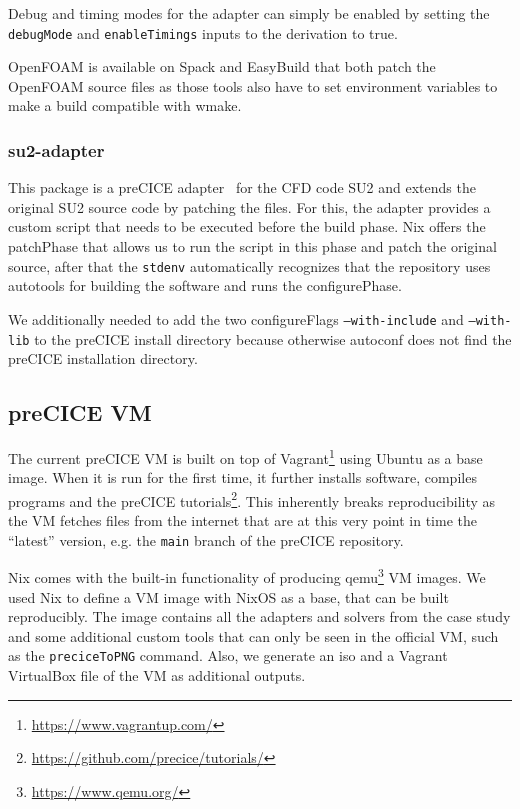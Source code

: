 \documentclass{eceasst}
\begin{document}
Debug and timing modes for the adapter can simply be enabled by setting the \texttt{debugMode} and \texttt{enableTimings} inputs to the derivation to true.

OpenFOAM is available on Spack and EasyBuild that both patch the OpenFOAM source files as those tools also have to set environment variables to make a build compatible with wmake.\\

\subsubsection{su2-adapter}

This package is a preCICE adapter~\cite{Uekermann2017_Adapters} for the CFD code SU2 and extends the original SU2 source code by patching the files.
For this, the adapter provides a custom script that needs to be executed before the build phase.
Nix offers the patchPhase that allows us to run the script in this phase and patch the original source, after that the \texttt{stdenv} automatically recognizes that the repository uses autotools for building the software and runs the configurePhase.

We additionally needed to add the two configureFlags \texttt{--with-include} and \texttt{--with-lib} to the preCICE install directory because otherwise autoconf does not find the preCICE installation directory.

\subsection{preCICE VM}

The current preCICE VM is built on top of Vagrant\footnote{\url{https://www.vagrantup.com/}} using Ubuntu as a base image.
When it is run for the first time, it further installs software, compiles programs and the preCICE tutorials\footnote{\url{https://github.com/precice/tutorials/}}.
This inherently breaks reproducibility as the VM fetches files from the internet that are at this very point in time the ``latest'' version, e.g. the \texttt{main} branch of the preCICE repository.

Nix comes with the built-in functionality of producing qemu\footnote{\url{https://www.qemu.org/}} VM images.
We used Nix to define a VM image with NixOS as a base, that can be built reproducibly.
The image contains all the adapters and solvers from the case study and some additional custom tools that can only be seen in the official VM, such as the \texttt{preciceToPNG} command.
Also, we generate an iso and a Vagrant VirtualBox file of the VM as additional outputs.
\end{document}
